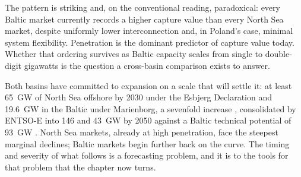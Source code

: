 \begin{table}[!htb]
\centering
\small
\caption{Market archetypes around the two basins. Wind penetration and value
factor estimates reflect approximate 2024 values; the final column gives the
dominant revenue support instrument for offshore wind.}
\label{tab:country_archetypes}
\end{table}

The pattern is striking and, on the conventional reading, paradoxical: every
Baltic market currently records a higher capture value than every North Sea
market, despite uniformly lower interconnection and, in Poland's case, minimal
system flexibility. Penetration is the dominant
predictor of capture value today. Whether that ordering survives as Baltic
capacity scales from single to double-digit gigawatts is the question a
cross-basin comparison exists to answer.

Both basins have committed to expansion on a scale that will settle it: at
least 65~GW of North Sea offshore by 2030 under the Esbjerg Declaration
\cite{Esbjerg2022} and 19.6~GW in the Baltic under Marienborg, a sevenfold
increase \cite{Marienborg2022}, consolidated by ENTSO-E into 146 and 43~GW by
2050 \cite{ONDP2024} against a Baltic technical potential of 93~GW
\cite{Barzehkar2024}. North Sea markets, already at high penetration, face
the steepest marginal declines; Baltic markets begin further back on the
curve. The timing and severity of what follows is a forecasting problem, and
it is to the tools for that problem that the chapter now turns.

